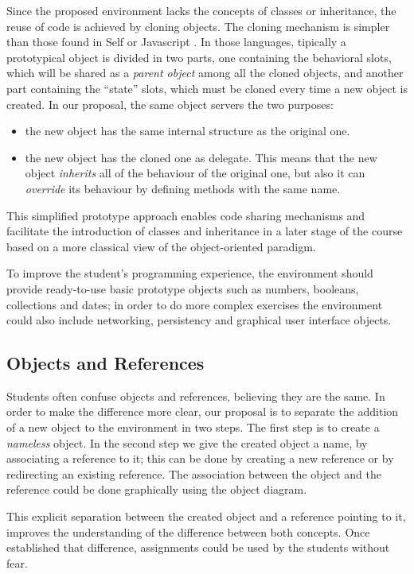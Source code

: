 \documentclass{sigplanconf}
\begin{document}
Since the proposed environment lacks the concepts of classes or inheritance, the
reuse of code is achieved by cloning objects. The cloning mechanism is simpler
than those found in Self \cite{Unga07} or Javascript \cite{Wilk02}. In those languages, tipically a
prototypical object is divided in two parts, one containing the behavioral
slots, which will be shared as a \textit{parent object} among all the cloned
objects, and another part containing the ``state'' slots, which must be cloned every time a new object is created. In our proposal, the same object servers the two purposes: 
\begin{itemize}
\item the new object has the same internal structure as the original one. 
\item the new object has the cloned one as delegate. This means that the new
object \textit{inherits} all of the behaviour of the original one, but also it can \textit{override} its behaviour by defining methods with the same name.
\end{itemize}	
This simplified prototype approach enables code sharing mechanisms and facilitate the introduction of classes and inheritance in a later stage of the course based on a more classical view of the object-oriented paradigm.

To improve the student’s programming experience, the environment should provide ready-to-use basic prototype objects such as numbers, booleans, collections and dates; in order to do more complex exercises the environment could also include networking, persistency and graphical user interface objects.

\subsection{Objects and References}
Students often confuse objects and references, believing they are the same. In order to make the difference more clear, our proposal is to separate the addition of a new object to the environment in two steps. The first step is to create a \textit{nameless} object. In the second step we give the created object a name, by associating a reference to it; this can be done by creating a new reference or by redirecting an existing reference. The association between the object and the reference could be done graphically using the object diagram. 

This explicit separation between the created object and a reference pointing to it, improves the understanding of the difference between both concepts. Once established that difference, assignments could be used by the students without fear.
\end{document}
